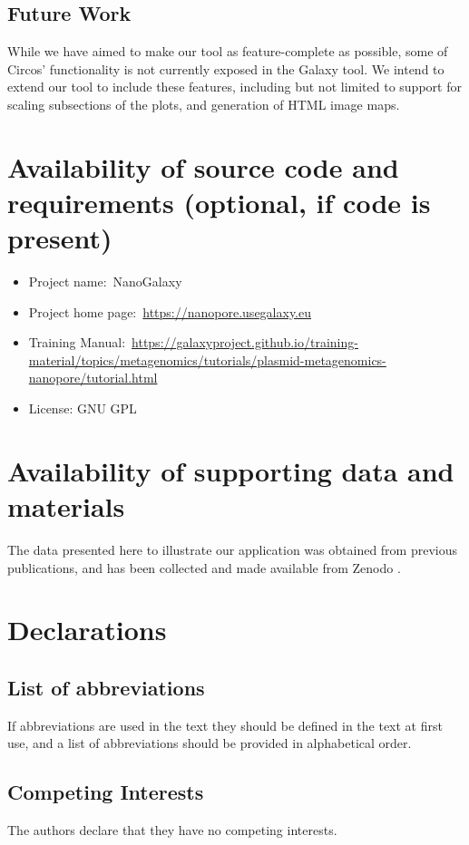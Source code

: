 \documentclass[a4paper,num-refs]{oup-contemporary}
\begin{document}
\subsection{Future Work}
While we have aimed to make our tool as feature-complete as possible, some of Circos' functionality is not currently exposed in the Galaxy tool. We intend to extend our tool to include these features, including but not limited to support for scaling subsections of the plots, and generation of HTML image maps.

\section{Availability of source code and requirements (optional, if code is present)}

\begin{itemize}
\item Project name:~NanoGalaxy
\item Project home page:~\url{https://nanopore.usegalaxy.eu}
\item Training Manual:~\url{https://galaxyproject.github.io/training-material/topics/metagenomics/tutorials/plasmid-metagenomics-nanopore/tutorial.html}
\item License: GNU GPL
\end{itemize}

\section{Availability of supporting data and materials}

The data presented here to illustrate our application was obtained from previous publications, and has been collected and made available from Zenodo \cite{TODO}.

\section{Declarations}

\subsection{List of abbreviations}
If abbreviations are used in the text they should be defined in the text at first use, and a list of abbreviations should be provided in alphabetical order.

\subsection{Competing Interests}
The authors declare that they have no competing interests.
\end{document}
